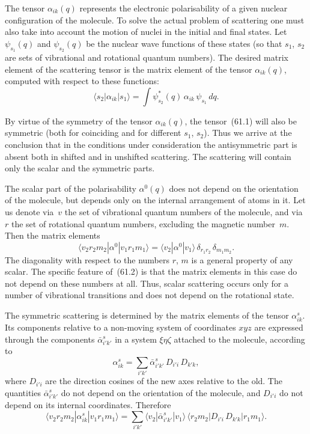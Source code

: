 The tensor $\alpha_{ik}(q)$ represents the electronic polarisability of a given nuclear configuration of the molecule. To solve the actual problem of scattering one must also take into account the motion of nuclei in the initial and final states. Let $\psi_{s_1}(q)$ and $\psi_{s_2}(q)$ be the nuclear wave functions of these states (so that $s_1$, $s_2$ are sets of vibrational and rotational quantum numbers). The desired matrix element of the scattering tensor is the matrix element of the tensor $\alpha_{ik}(q)$, computed with respect to these functions:
\begin{equation}
\langle s_2|\alpha_{ik}|s_1\rangle = \int\psi^*_{s_2}(q)\,\alpha_{ik}\,\psi_{s_1}\,dq.
\tag{61.1}
\end{equation}

By virtue of the symmetry of the tensor $\alpha_{ik}(q)$, the tensor~(61.1) will also be symmetric (both for coinciding and for different $s_1$, $s_2$). Thus we arrive at the conclusion that in the conditions under consideration the antisymmetric part is absent both in shifted and in unshifted scattering. The scattering will contain only the scalar and the symmetric parts.

The scalar part of the polarisability $\alpha^0(q)$ does not depend on the orientation of the molecule, but depends only on the internal arrangement of atoms in it. Let us denote via~$v$ the set of vibrational quantum numbers of the molecule, and via~$r$ the set of rotational quantum numbers, excluding the magnetic number~$m$. Then the matrix elements
\begin{equation}
\langle v_2 r_2 m_2|\alpha^0|v_1 r_1 m_1\rangle = \langle v_2|\alpha^0|v_1\rangle\,\delta_{r_1r_2}\,\delta_{m_1m_2}.
\tag{61.2}
\end{equation}
The diagonality with respect to the numbers $r$, $m$ is a general property of any scalar. The specific feature of~(61.2) is that the matrix elements in this case do not depend on these numbers at all. Thus, scalar scattering occurs only for a number of vibrational transitions and does not depend on the rotational state.

The symmetric scattering is determined by the matrix elements of the tensor $\alpha^s_{ik}$. Its components relative to a non-moving system of coordinates $xyz$ are expressed through the components $\bar{\alpha}^s_{i'k'}$ in a system $\xi\eta\zeta$ attached to the molecule, according to
\begin{equation}
\alpha^s_{ik} = \sum_{i'k'}\bar{\alpha}^s_{i'k'}\,D_{i'i}\,D_{k'k},
\tag{61.3}
\end{equation}
where $D_{i'i}$ are the direction cosines of the new axes relative to the old. The quantities $\bar{\alpha}^s_{i'k'}$ do not depend on the orientation of the molecule, and $D_{i'i}$ do not depend on its internal coordinates. Therefore
\[
\langle v_2 r_2 m_2|\alpha^s_{ik}|v_1 r_1 m_1\rangle = \sum_{i'k'}\langle v_2|\bar{\alpha}^s_{i'k'}|v_1\rangle\,\langle r_2 m_2|D_{i'i}\,D_{k'k}|r_1 m_1\rangle.
\]


